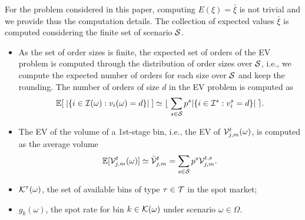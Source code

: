 \documentclass[a4paper,11pt]{article}
\begin{document}
	For the problem considered in this paper, computing $E(\xi)= \bar{\xi}$ is not trivial and we provide thus the computation details.
	The collection of expected values $\bar{\xi}$ is computed considering the finite set of scenario $\cal S$.
	\begin{itemize}
		\item As the set of order sizes is finite, the expected set of orders of the EV problem is computed through the distribution of order sizes over $\cal S$, i.e., we compute the expected number of orders for each size over $\cal S$ and keep the rounding.
		The number of orders of size $d$ in the EV problem is computed as
		\[
		\mathbb{E}[\;|\{i \in {\cal I}(\omega) : v_i(\omega) = d\}|\;] \simeq \lfloor \; \sum\limits_{s \in \mathcal{S}} p^s | \{ i \in {\cal I}^s : v^s_i = d \}| \; \rceil.
		\]
		\item The EV of the volume of a 1st-stage bin, i.e., the EV of ${\cal V}_{j,m}^t(\omega)$, is computed as the average volume
		\[
		\mathbb{E}[{\cal V}_{j,m}^{t}(\omega)] \simeq \bar{\cal V}_{j,m}^t = \sum\limits_{s \in \mathcal{S}} p^s {\cal V}_{j,m}^{t,s}.
		\]
		\item ${\cal K}^{\tau}(\omega)$, the set of available bins of type $\tau \in \cal T$ in the spot market;
		\item $g_k(\omega)$, the spot rate for bin $ k \in {\cal K}(\omega)$ under scenario $\omega \in \Omega$.
	\end{itemize}
	
	
\end{document}
